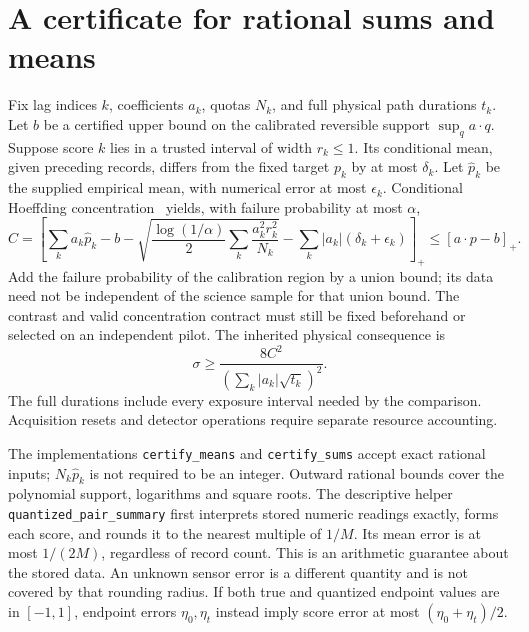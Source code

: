 \section{A certificate for rational sums and means}
Fix lag indices $k$, coefficients $a_k$, quotas $N_k$, and full physical path
durations $t_k$. Let $b$ be a certified upper bound on the calibrated reversible
support $\sup_q a\cdot q$. Suppose score $k$ lies in a trusted interval of width
$r_k\leq1$. Its conditional mean, given preceding records, differs from the
fixed target $p_k$ by at most $\delta_k$. Let $\widehat p_k$ be the supplied
empirical mean, with numerical error at most $\epsilon_k$. Conditional
Hoeffding concentration~\cite{caHoeffding1963} yields, with failure probability
at most $\alpha$,
\begin{equation}
 C=\left[\sum_k a_k\widehat p_k-b
 -\sqrt{\frac{\log(1/\alpha)}2\sum_k\frac{a_k^2r_k^2}{N_k}}
 -\sum_k|a_k|(\delta_k+\epsilon_k)\right]_+
 \leq [a\cdot p-b]_+.
 \label{eq:ci-analog-confidence}
\end{equation}
Add the failure probability of the calibration region by a union bound; its
data need not be independent of the science sample for that union bound.
The contrast and valid concentration contract must still be fixed beforehand
or selected on an independent pilot. The inherited physical consequence is
\begin{equation}
 \sigma\geq\frac{8C^2}{(\sum_k|a_k|\sqrt{t_k})^2}.
 \label{eq:ci-analog-rate}
\end{equation}
The full durations include every exposure interval needed by the comparison.
Acquisition resets and detector operations require separate resource accounting.

The implementations \texttt{certify\_means} and \texttt{certify\_sums} accept
exact rational inputs; $N_k\widehat p_k$ is not required to be an integer.
Outward rational bounds cover the polynomial support, logarithms and square
roots. The descriptive helper \texttt{quantized\_pair\_summary} first interprets
stored numeric readings exactly, forms each score, and rounds it to the nearest
multiple of $1/M$. Its mean error is at most $1/(2M)$, regardless of record
count. This is an arithmetic guarantee about the stored data. An unknown sensor
error is a different quantity and is not covered by that rounding radius.
If both true and quantized endpoint values are in $[-1,1]$, endpoint errors
$\eta_0,\eta_t$ instead imply score error at most $(\eta_0+\eta_t)/2$.

